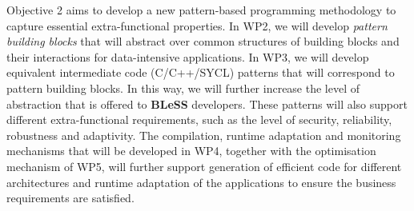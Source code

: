 \documentclass[a4paper,11pt]{article}
\newcommand{\project}[1]{\textbf{#1}\xspace}
\newcommand{\BLESS}{\project{BLeSS}}
\newcommand{\TheProject}{\BLESS}
\begin{document}
Objective 2 aims to develop a new pattern-based programming methodology to capture essential extra-functional
properties. In WP2, we will develop \emph{pattern building blocks} that will abstract over common structures of building blocks and their interactions for data-intensive applications. In WP3, we will develop equivalent intermediate code (C/C++/SYCL) patterns that will correspond to pattern building blocks. In this way, we will further increase the level of abstraction that is offered to \TheProject{} developers.
These patterns will also support different extra-functional 
requirements, such as the level of security, reliability, robustness and adaptivity.
The compilation, runtime adaptation and monitoring mechanisms that will be developed in WP4, together with
the optimisation mechanism of WP5, will further support generation of efficient code for different architectures and runtime
adaptation of the applications to ensure the business requirements are satisfied. 
\end{document}

